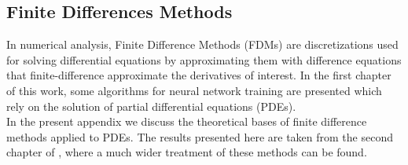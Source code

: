 \documentclass[%
    corpo=11pt,
    twoside,
    stile=classica,
    oldstyle,
    autoretitolo,
    tipotesi=magistrale,
    greek,
    evenboxes,
    english
]{toptesi}
\begin{document}
\begin{appendices}

\chapter{Finite Differences Methods}
\label{fdmappendix}
In numerical analysis, Finite Difference Methods (FDMs) are discretizations used for solving differential equations by approximating them with difference equations that finite-difference approximate the derivatives of interest. In the first chapter of this work, some algorithms for neural network training are presented which rely on the solution of partial differential equations (PDEs).  \\
In the present appendix we discuss the theoretical bases of finite difference methods applied to PDEs. The results presented here are taken from the second chapter of \cite{fdm}, where a much wider treatment of these methods can be found.

\end{appendices}
\end{document}

